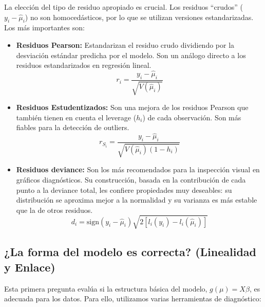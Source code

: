 \documentclass[
  letterpaper,
  DIV=11,
  numbers=noendperiod]{scrreprt}
\begin{document}
La elección del tipo de residuo apropiado es crucial. Los residuos
``crudos'' (\(y_i - \hat{\mu}_i\)) no son homocedásticos, por lo que se
utilizan versiones estandarizadas. Los más importantes son:

\begin{itemize}
\item
  \textbf{Residuos Pearson:} Estandarizan el residuo crudo dividiendo
  por la desviación estándar predicha por el modelo. Son un análogo
  directo a los residuos estandarizados en regresión lineal. \[
    r_i = \frac{y_i - \hat{\mu}_i}{\sqrt{V(\hat{\mu}_i)}}
    \]
\item
  \textbf{Residuos Estudentizados:} Son una mejora de los residuos
  Pearson que también tienen en cuenta el leverage (\(h_i\)) de cada
  observación. Son más fiables para la detección de outliers. \[
    r_{S_i} = \frac{y_i - \hat{\mu}_i}{\sqrt{V(\hat{\mu}_i)(1-h_i)}}
    \]
\item
  \textbf{Residuos deviance:} Son los más recomendados para la
  inspección visual en gráficos diagnósticos. Su construcción, basada en
  la contribución de cada punto a la deviance total, les confiere
  propiedades muy deseables: su distribución se aproxima mejor a la
  normalidad y su varianza es más estable que la de otros residuos. \[
    d_i = \text{sign}(y_i - \hat{\mu}_i) \sqrt{2[l_i(y_i) - l_i(\hat{\mu}_i)]}
    \]
\end{itemize}

\subsection{¿La forma del modelo es correcta? (Linealidad y
Enlace)}\label{la-forma-del-modelo-es-correcta-linealidad-y-enlace}

Esta primera pregunta evalúa si la estructura básica del modelo,
\(g(\mu) = X\beta\), es adecuada para los datos. Para ello, utilizamos
varias herramientas de diagnóstico:
\end{document}

